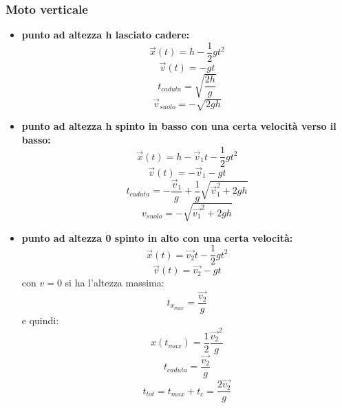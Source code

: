 \documentclass[a4paper,12pt, oneside]{book}
\begin{document}
\subsubsection{Moto verticale}
\begin{itemize}
\item \textbf{punto ad altezza h lasciato cadere:}
$$\vec{x}(t)=h-\frac{1}{2} g t^2$$
$$\vec{v}(t)=-gt$$
$$t_{caduta}=\sqrt{\frac{2 h}{g}}$$
$$\vec{v}_{suolo}=-\sqrt{2 g h}$$
\item \textbf{punto ad altezza h spinto in basso con una certa velocità verso il basso:}
$$\vec{x}(t)=h-\vec{v}_1t-\frac{1}{2} g t^2$$
$$\vec{v}(t)=-\vec{v}_1-gt$$
$$t_{caduta}=-\frac{\vec{v}_1}{g}+\frac{1}{g}\sqrt{\vec{v}_1^2+2gh}$$
$$v_{suolo}=-\sqrt{\vec{v_1}^2+2gh}$$
\item \textbf{punto ad altezza 0 spinto in alto con una certa velocità:}
$$\vec{x}(t)=\vec{v_2}t-\frac{1}{2} g t^2$$
$$\vec{v}(t)=\vec{v_2}-gt$$
con $v=0$ si ha l'altezza massima:
$$t_{x_{max}}=\frac{\vec{v_2}}{g}$$
e quindi:
$$x(t_{max})=\frac{1}{2}\frac{\vec{v_2}^2}{g}$$
$$t_{caduta}=\frac{\vec{v_2}}{g}$$
$$t_{tot}=t_{max}+t_c=\frac{2\vec{v_2}}{g}$$
\end{itemize}
\begin{comment}
\subsubsection{Moto nel Piano}\textbf{da sistemare}
\begin{itemize}
\item \textbf{modulo della velocità in componenti cartesiane}: $$v=|\vec{v}|=\sqrt{v_x^2+v_y^2}$$
\item \textbf{modulo della velocità in componenti cartesiane}: 
$$v=|\vec{v}|=\sqrt{v_r^2+v_q^2}$$
\item \textbf{accelerazione nel piano: }$\vec{a}=\vec{a}_T+\vec{a}_n$
\end{itemize}
\end{comment}
\end{document}
